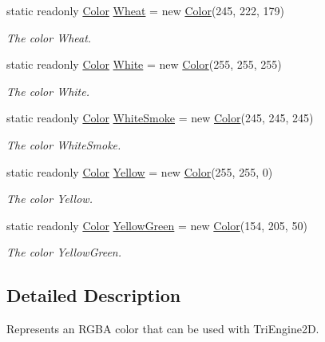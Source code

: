 \begin{DoxyCompactItemize}
static readonly \hyperlink{struct_tri_devs_1_1_tri_engine_1_1_color}{Color} \hyperlink{struct_tri_devs_1_1_tri_engine_1_1_color_a84e93e4b37ce1a06dcd388e826f0e53c}{Wheat} = new \hyperlink{struct_tri_devs_1_1_tri_engine_1_1_color}{Color}(245, 222, 179)
\begin{DoxyCompactList}\small\item\em The color Wheat. \end{DoxyCompactList}\item 
static readonly \hyperlink{struct_tri_devs_1_1_tri_engine_1_1_color}{Color} \hyperlink{struct_tri_devs_1_1_tri_engine_1_1_color_a661143d6db96a873fb04892f3624c2b4}{White} = new \hyperlink{struct_tri_devs_1_1_tri_engine_1_1_color}{Color}(255, 255, 255)
\begin{DoxyCompactList}\small\item\em The color White. \end{DoxyCompactList}\item 
static readonly \hyperlink{struct_tri_devs_1_1_tri_engine_1_1_color}{Color} \hyperlink{struct_tri_devs_1_1_tri_engine_1_1_color_a80adde12a126efee5ec479f39e8329ed}{White\-Smoke} = new \hyperlink{struct_tri_devs_1_1_tri_engine_1_1_color}{Color}(245, 245, 245)
\begin{DoxyCompactList}\small\item\em The color White\-Smoke. \end{DoxyCompactList}\item 
static readonly \hyperlink{struct_tri_devs_1_1_tri_engine_1_1_color}{Color} \hyperlink{struct_tri_devs_1_1_tri_engine_1_1_color_a122075dc859f3eb94a8b875a04d64113}{Yellow} = new \hyperlink{struct_tri_devs_1_1_tri_engine_1_1_color}{Color}(255, 255, 0)
\begin{DoxyCompactList}\small\item\em The color Yellow. \end{DoxyCompactList}\item 
static readonly \hyperlink{struct_tri_devs_1_1_tri_engine_1_1_color}{Color} \hyperlink{struct_tri_devs_1_1_tri_engine_1_1_color_a23a4b1ffdac1f629bc4f0789db106ebc}{Yellow\-Green} = new \hyperlink{struct_tri_devs_1_1_tri_engine_1_1_color}{Color}(154, 205, 50)
\begin{DoxyCompactList}\small\item\em The color Yellow\-Green. \end{DoxyCompactList}\end{DoxyCompactItemize}


\subsection{Detailed Description}
Represents an R\-G\-B\-A color that can be used with Tri\-Engine2\-D. 



